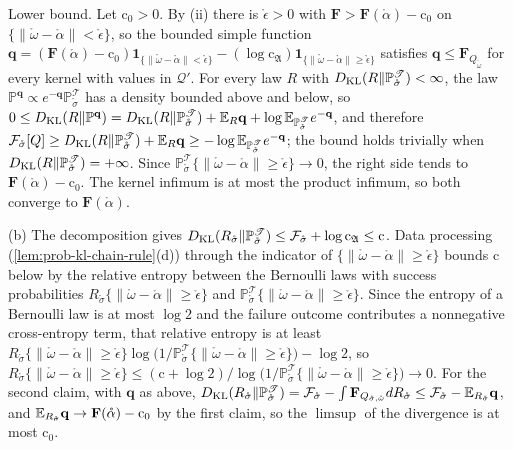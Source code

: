 Lower bound. Let $\mathrm c_0>0$. By (ii) there is $\mathring\epsilon>0$ with $\mathbf F>\mathbf F(\mathring\alpha)-\mathrm c_0$
on $\{\lVert\mathring\omega-\mathring\alpha\rVert<\mathring\epsilon\}$, so the bounded simple function
$\mathbf q=(\mathbf F(\mathring\alpha)-\mathrm c_0)\mathbf 1_{\{\lVert\mathring\omega-\mathring\alpha\rVert<\mathring\epsilon\}}-(\log\mathrm c_{\mathfrak A})\mathbf 1_{\{\lVert\mathring\omega-\mathring\alpha\rVert\geq\mathring\epsilon\}}$
satisfies
$\mathbf q\leq\mathbf F_{Q_{\mathring\omega}}$ for every kernel with values in $\mathcal Q'$. For every law $R$ with
$D_{\mathrm{KL}}(R\Vert\mathbb P^{\mathscr T}_{\mathring\sigma})<\infty$, the law
$\mathbb P^{\mathbf q}\propto e^{-\mathbf q}\mathbb P^{\mathscr T}_{\mathring\sigma}$ has a density bounded above and below, so
$0\leq D_{\mathrm{KL}}(R\Vert\mathbb P^{\mathbf q})=D_{\mathrm{KL}}(R\Vert\mathbb P^{\mathscr T}_{\mathring\sigma})+\mathbb E_R\mathbf q+\log\mathbb E_{\mathbb P^{\mathscr T}_{\mathring\sigma}}e^{-\mathbf q}$,
and therefore
$\mathcal F_{\mathring\sigma}[Q]\geq D_{\mathrm{KL}}(R\Vert\mathbb P^{\mathscr T}_{\mathring\sigma})+\mathbb E_R\mathbf q\geq-\log\mathbb E_{\mathbb P^{\mathscr T}_{\mathring\sigma}}e^{-\mathbf q}$;
the bound holds trivially when $D_{\mathrm{KL}}(R\Vert\mathbb P^{\mathscr T}_{\mathring\sigma})=+\infty$. Since
$\mathbb P^{\mathscr T}_{\mathring\sigma}\{\lVert\mathring\omega-\mathring\alpha\rVert\geq\mathring\epsilon\}\to0$, the right side tends to
$\mathbf F(\mathring\alpha)-\mathrm c_0$. The
kernel infimum is at most the product infimum, so both converge to $\mathbf F(\mathring\alpha)$.

(b) The decomposition gives
$D_{\mathrm{KL}}(R_{\mathring\sigma}\Vert\mathbb P^{\mathscr T}_{\mathring\sigma})\leq\mathcal F_{\mathring\sigma}+\log\mathrm c_{\mathfrak A}\leq\mathrm c$. Data processing
(\cref{lem:prob-kl-chain-rule}(d)) through the indicator of $\{\lVert\mathring\omega-\mathring\alpha\rVert\geq\mathring\epsilon\}$ bounds
$\mathrm c$ below by the relative entropy between the Bernoulli laws with success probabilities
$R_{\mathring\sigma}\{\lVert\mathring\omega-\mathring\alpha\rVert\geq\mathring\epsilon\}$ and
$\mathbb P^{\mathscr T}_{\mathring\sigma}\{\lVert\mathring\omega-\mathring\alpha\rVert\geq\mathring\epsilon\}$. Since the entropy of a Bernoulli law is
at most $\log2$ and the failure outcome contributes a nonnegative cross-entropy term, that relative
entropy is at least
$R_{\mathring\sigma}\{\lVert\mathring\omega-\mathring\alpha\rVert\geq\mathring\epsilon\}\log\bigl(1/\mathbb P^{\mathscr T}_{\mathring\sigma}\{\lVert\mathring\omega-\mathring\alpha\rVert\geq\mathring\epsilon\}\bigr)-\log2$,
so $R_{\mathring\sigma}\{\lVert\mathring\omega-\mathring\alpha\rVert\geq\mathring\epsilon\}\leq(\mathrm c+\log2)/\log\bigl(1/\mathbb P^{\mathscr T}_{\mathring\sigma}\{\lVert\mathring\omega-\mathring\alpha\rVert\geq\mathring\epsilon\}\bigr)\to0$.
For the second claim, with
$\mathbf q$ as above,
$D_{\mathrm{KL}}(R_{\mathring\sigma}\Vert\mathbb P^{\mathscr T}_{\mathring\sigma})=\mathcal F_{\mathring\sigma}-\int\mathbf F_{Q_{\mathring\sigma,\mathring\omega}}dR_{\mathring\sigma}\leq\mathcal F_{\mathring\sigma}-\mathbb E_{R_{\mathring\sigma}}\mathbf q$,
and $\mathbb E_{R_{\mathring\sigma}}\mathbf q\to\mathbf F(\mathring\alpha)-\mathrm c_0$ by the first claim, so the $\limsup$ of the
divergence is at most $\mathrm c_0$.

